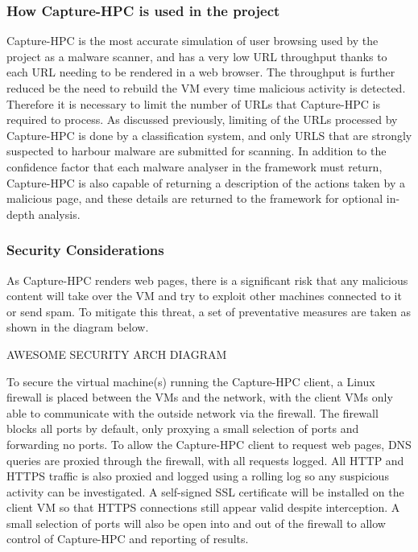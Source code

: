 \subsubsection{How Capture-HPC is used in the project}

Capture-HPC is the most accurate simulation of user browsing used by the project
as a malware scanner, and has a very low URL throughput thanks to each URL
needing to be rendered in a web browser. The throughput is further reduced be
the need to rebuild the VM every time malicious activity is detected. Therefore
it is necessary to limit the number of URLs that Capture-HPC is required to
process. As discussed previously, limiting of the URLs processed by Capture-HPC
is done by a classification system, and only URLS that are strongly suspected to
harbour malware are submitted for scanning. In addition to the confidence factor
that each malware analyser in the framework must return, Capture-HPC is also
capable of returning a description of the actions taken by a malicious page, and
these details are returned to the framework for optional in-depth analysis.

\subsubsection{Security Considerations}

As Capture-HPC renders web pages, there is a significant risk that any malicious
content will take over the VM and try to exploit other machines connected to it
or send spam. To mitigate this threat, a set of preventative measures are taken
as shown in the diagram below.

AWESOME SECURITY ARCH DIAGRAM

To secure the virtual machine(s) running the Capture-HPC client, a Linux
firewall is placed between the VMs and the network, with the client VMs only
able to communicate with the outside network via the firewall. The firewall
blocks all ports by default, only proxying a small selection of ports and
forwarding no ports. To allow the Capture-HPC client to request web pages, DNS
queries are proxied through the firewall, with all requests logged. All HTTP and
HTTPS traffic is also proxied and logged using a rolling log so any suspicious
activity can be investigated. A self-signed SSL certificate will be installed on
the client VM so that HTTPS connections still appear valid despite interception.
A small selection of ports will also be open into and out of the firewall to
allow control of Capture-HPC and reporting of results.

